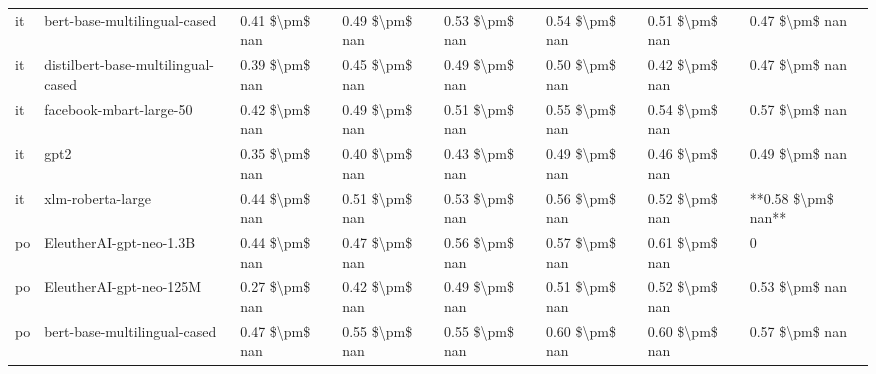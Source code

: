 \begin{tabular}{llllllll}
      it &       bert-base-multilingual-cased & 0.41 \$\textbackslash pm\$ nan &            0.49 \$\textbackslash pm\$ nan &        0.53 \$\textbackslash pm\$ nan &         0.54 \$\textbackslash pm\$ nan &                          0.51 \$\textbackslash pm\$ nan &     0.47 \$\textbackslash pm\$ nan \\
      it & distilbert-base-multilingual-cased & 0.39 \$\textbackslash pm\$ nan &            0.45 \$\textbackslash pm\$ nan &        0.49 \$\textbackslash pm\$ nan &         0.50 \$\textbackslash pm\$ nan &                          0.42 \$\textbackslash pm\$ nan &     0.47 \$\textbackslash pm\$ nan \\
      it &            facebook-mbart-large-50 & 0.42 \$\textbackslash pm\$ nan &            0.49 \$\textbackslash pm\$ nan &        0.51 \$\textbackslash pm\$ nan &         0.55 \$\textbackslash pm\$ nan &                          0.54 \$\textbackslash pm\$ nan &     0.57 \$\textbackslash pm\$ nan \\
      it &                               gpt2 & 0.35 \$\textbackslash pm\$ nan &            0.40 \$\textbackslash pm\$ nan &        0.43 \$\textbackslash pm\$ nan &         0.49 \$\textbackslash pm\$ nan &                          0.46 \$\textbackslash pm\$ nan &     0.49 \$\textbackslash pm\$ nan \\
      it &                  xlm-roberta-large & 0.44 \$\textbackslash pm\$ nan &            0.51 \$\textbackslash pm\$ nan &        0.53 \$\textbackslash pm\$ nan &         0.56 \$\textbackslash pm\$ nan &                          0.52 \$\textbackslash pm\$ nan & **0.58 \$\textbackslash pm\$ nan** \\
      po &            EleutherAI-gpt-neo-1.3B & 0.44 \$\textbackslash pm\$ nan &            0.47 \$\textbackslash pm\$ nan &        0.56 \$\textbackslash pm\$ nan &         0.57 \$\textbackslash pm\$ nan &                          0.61 \$\textbackslash pm\$ nan &                  0 \\
      po &            EleutherAI-gpt-neo-125M & 0.27 \$\textbackslash pm\$ nan &            0.42 \$\textbackslash pm\$ nan &        0.49 \$\textbackslash pm\$ nan &         0.51 \$\textbackslash pm\$ nan &                          0.52 \$\textbackslash pm\$ nan &     0.53 \$\textbackslash pm\$ nan \\
      po &       bert-base-multilingual-cased & 0.47 \$\textbackslash pm\$ nan &            0.55 \$\textbackslash pm\$ nan &        0.55 \$\textbackslash pm\$ nan &         0.60 \$\textbackslash pm\$ nan &                          0.60 \$\textbackslash pm\$ nan &     0.57 \$\textbackslash pm\$ nan \\

\end{tabular}
